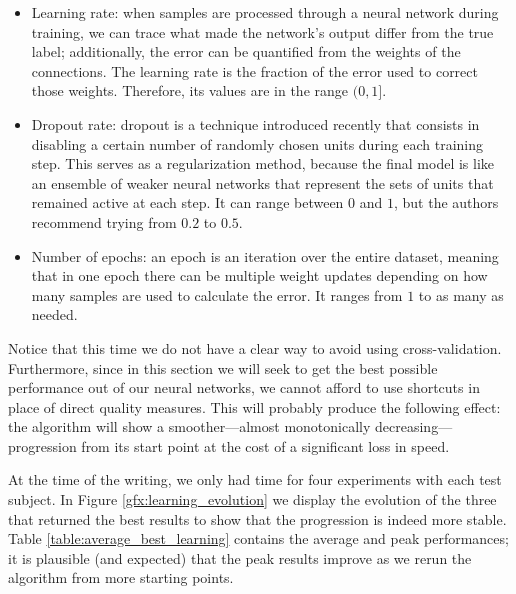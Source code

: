 	\begin{itemize}

		\item
		Learning rate: when samples are processed through a neural network during training, we can trace what made the network's output differ from the true label; additionally, the error can be quantified from the weights of the connections. The learning rate is the fraction of the error used to correct those weights. Therefore, its values are in the range $(0,1]$.

		\item
		Dropout rate: dropout is a technique introduced recently \cite{srivastava2014dropout} that consists in disabling a certain number of randomly chosen units during each training step. This serves as a regularization method, because the final model is like an ensemble of weaker neural networks that represent the sets of units that remained active at each step. It can range between $0$ and $1$, but the authors recommend trying from $0.2$ to $0.5$.

		\item
		Number of epochs: an epoch is an iteration over the entire dataset, meaning that in one epoch there can be multiple weight updates depending on how many samples are used to calculate the error. It ranges from $1$ to as many as needed.

	\end{itemize}

	Notice that this time we do not have a clear way to avoid using cross-validation. Furthermore, since in this section we will seek to get the best possible performance out of our neural networks, we cannot afford to use shortcuts in place of direct quality measures. This will probably produce the following effect: the algorithm will show a smoother---almost monotonically decreasing---progression from its start point at the cost of a significant loss in speed.

	At the time of the writing, we only had time for four experiments with each test subject. In Figure \ref{gfx:learning_evolution} we display the evolution of the three that returned the best results to show that the progression is indeed more stable. Table \ref{table:average_best_learning} contains the average and peak performances; it is plausible (and expected) that the peak results improve as we rerun the algorithm from more starting points.

\newpage

